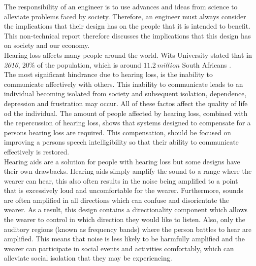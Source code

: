 \documentclass[11pt,onecolumn]{witseiepaper}
\begin{document}
\begin{appendices}
\noindent The responsibility of an engineer is to use advances and ideas from science to alleviate problems faced by society. Therefore, an engineer must always consider the implications that their design has on the people that it is intended to benefit. This non-technical report therefore discusses the implications that this design has on society and our economy.\\
\newline
\noindent Hearing loss affects many people around the world. Wits University stated that in \textit{2016}, $20\%$ of the population, which is around $11.2\: million$ South Africans \cite{witsHearingStats}.\\
\newline
\noindent The most significant hindrance due to hearing loss, is the inability to communicate affectively with others. This inability to communicate leads to an individual becoming isolated from society and subsequent isolation, dependence, depression and frustration may occur. All of these factos affect the quality of life od the individual. The amount of people affected by hearing loss, combined with the repercussion of hearing loss, shows that systems designed to compensate for a persons hearing loss are required. This compensation, should be focused on improving a persons speech intelligibility so that their ability to communicate effectively is restored.\\
\newline
\noindent Hearing aids are a solution for people with hearing loss but some designs have their own drawbacks. Hearing aids simply amplify the sound to a range where the wearer can hear, this also often results in the noise being amplified to a point that is excessively loud and uncomfortable for the wearer. Furthermore, sounds are often amplified in all directions which can confuse and disorientate the wearer. As a result, this design contains a directionality component which allows the wearer to control in which direction they would like to listen. Also, only the auditory regions (known as frequency bands) where the person battles to hear are amplified. This means that noise is less likely to be harmfully amplified and the wearer can participate in social events and activities comfortably, which can alleviate social isolation that they may be experiencing.\\
\newline

\end{appendices}
\end{document}

